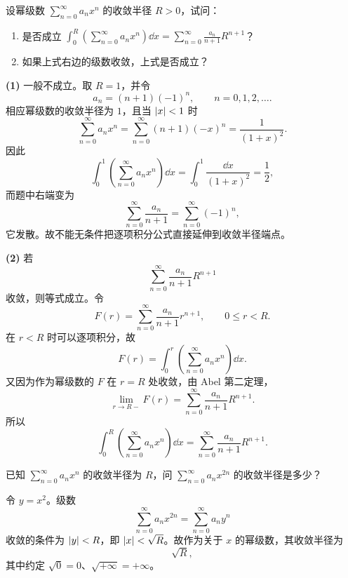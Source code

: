 \begin{xthought}[5]
设幂级数 $\displaystyle\sum_{n=0}^{\infty}a_nx^n$ 的收敛半径 $R>0$，试问：
  \begin{enumerate}[label=(\arabic*)]
    \item 是否成立 $\displaystyle\int_0^R\left(\sum_{n=0}^{\infty}a_nx^n\right)\dd x=\sum_{n=0}^{\infty}\frac{a_n}{n+1}R^{n+1}$？
    \item 如果上式右边的级数收敛，上式是否成立？
  \end{enumerate}
\end{xthought}
\begin{xsolution}
\textbf{(1)} 一般不成立。取 $R=1$，并令
\[
  a_n=(n+1)(-1)^n,\qquad n=0,1,2,\ldots.
\]
相应幂级数的收敛半径为 $1$，且当 $\lvert x\rvert<1$ 时
\[
  \sum_{n=0}^{\infty}a_nx^n
  =\sum_{n=0}^{\infty}(n+1)(-x)^n
  =\frac1{(1+x)^2}.
\]
因此
\[
  \int_0^1\left(\sum_{n=0}^{\infty}a_nx^n\right)\dd x
  =\int_0^1\frac{\dd x}{(1+x)^2}
  =\frac12,
\]
而题中右端变为
\[
  \sum_{n=0}^{\infty}\frac{a_n}{n+1}
  =\sum_{n=0}^{\infty}(-1)^n,
\]
它发散。故不能无条件把逐项积分公式直接延伸到收敛半径端点。

\textbf{(2)} 若
\[
  \sum_{n=0}^{\infty}\frac{a_n}{n+1}R^{n+1}
\]
收敛，则等式成立。令
\[
  F(r)=\sum_{n=0}^{\infty}\frac{a_n}{n+1}r^{n+1},
  \qquad 0\leqslant r<R.
\]
在 $r<R$ 时可以逐项积分，故
\[
  F(r)=\int_0^r\left(\sum_{n=0}^{\infty}a_nx^n\right)\dd x.
\]
又因为作为幂级数的 $F$ 在 $r=R$ 处收敛，由 Abel 第二定理，
\[
  \lim_{r\to R-}F(r)
  =\sum_{n=0}^{\infty}\frac{a_n}{n+1}R^{n+1}.
\]
所以
\[
  \int_0^R\left(\sum_{n=0}^{\infty}a_nx^n\right)\dd x
  =\sum_{n=0}^{\infty}\frac{a_n}{n+1}R^{n+1}.
\]
\end{xsolution}


\begin{xthought}[6]
已知 $\displaystyle\sum_{n=0}^{\infty}a_nx^n$ 的收敛半径为 $R$，问 $\displaystyle\sum_{n=0}^{\infty}a_nx^{2n}$ 的收敛半径是多少？
\end{xthought}
\begin{xsolution}
令 $y=x^2$。级数
\[
  \sum_{n=0}^{\infty}a_nx^{2n}
  =\sum_{n=0}^{\infty}a_ny^n
\]
收敛的条件为 $\lvert y\rvert<R$，即 $\lvert x\rvert<\sqrt R$。故作为关于 $x$ 的幂级数，其收敛半径为
\[
  \sqrt R,
\]
其中约定 $\sqrt0=0$、$\sqrt{+\infty}=+\infty$。
\end{xsolution}


